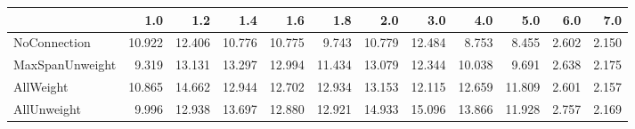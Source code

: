 \begin{tabular}{lrrrrrrrrrrr}
\toprule
{} &    1.0 &    1.2 &    1.4 &    1.6 &    1.8 &    2.0 &    3.0 &    4.0 &    5.0 &   6.0 &   7.0 \\
\midrule
NoConnection    & 10.922 & 12.406 & 10.776 & 10.775 &  9.743 & 10.779 & 12.484 &  8.753 &  8.455 & 2.602 & 2.150 \\
MaxSpanUnweight &  9.319 & 13.131 & 13.297 & 12.994 & 11.434 & 13.079 & 12.344 & 10.038 &  9.691 & 2.638 & 2.175 \\
AllWeight       & 10.865 & 14.662 & 12.944 & 12.702 & 12.934 & 13.153 & 12.115 & 12.659 & 11.809 & 2.601 & 2.157 \\
AllUnweight     &  9.996 & 12.938 & 13.697 & 12.880 & 12.921 & 14.933 & 15.096 & 13.866 & 11.928 & 2.757 & 2.169 \\
\bottomrule
\end{tabular}
